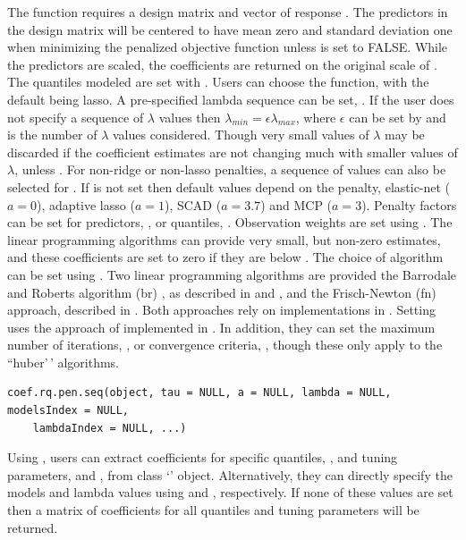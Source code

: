 The function  requires a design matrix  and vector of response . The predictors in the design matrix will be centered to have mean zero and standard deviation one when minimizing the penalized objective function unless  is set to FALSE. While the predictors are scaled, the coefficients are returned on the original scale of . The quantiles modeled are set with . Users can choose the  function, with the default being lasso. A pre-specified lambda sequence can be set, . If the user does not specify a sequence of \(\lambda\) values then \(\lambda_{min}=\epsilon\lambda_{max}\), where \(\epsilon\) can be set by  and  is the number of \(\lambda\) values considered. Though very small values of \(\lambda\) may be discarded if the coefficient estimates are not changing much with smaller values of \(\lambda\), unless . For non-ridge or non-lasso penalties, a sequence of values can also be selected for . If  is not set then default values depend on the penalty, elastic-net (\(a=0\)), adaptive lasso (\(a=1\)), SCAD (\(a=3.7\)) and MCP (\(a=3\)). Penalty factors can be set for predictors, , or quantiles, . Observation weights are set using . The linear programming algorithms can provide very small, but non-zero estimates, and these coefficients are set to zero if they are below . The choice of algorithm can be set using . Two linear programming algorithms are provided the Barrodale and Roberts algorithm (br) \citep{br}, as described in \citet{crq1} and \citet{crq2}, and the Frisch-Newton (fn) approach, described in \citet{portnoy1997}. Both approaches rely on implementations in . Setting  uses the approach of \citet{huber_cd} implemented in . In addition, they can set the maximum number of iterations, , or convergence criteria, , though these only apply to the ``huber'\,' algorithms.

\begin{verbatim}
coef.rq.pen.seq(object, tau = NULL, a = NULL, lambda = NULL, modelsIndex = NULL,
    lambdaIndex = NULL, ...)
\end{verbatim}

Using , users can extract coefficients for specific quantiles, , and tuning parameters,  and , from class `' object. Alternatively, they can directly specify the models and lambda values using  and , respectively. If none of these values are set then a matrix of coefficients for all quantiles and tuning parameters will be returned. \newline


